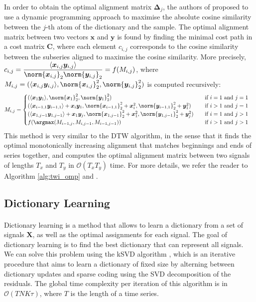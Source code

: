 \documentclass[11pt]{article}
\begin{document}
In order to obtain the optimal alignment matrix $\bm{\Delta}_j$, the authors of \cite{main_paper} proposed to use a dynamic programming approach to maximise the absolute cosine similarity between the $j$-th atom of the dictionary and the sample. The optimal alignment matrix between two vectors $\bm{x}$ and $\bm{y}$ is found by finding the minimal cost path in a cost matrix $\bm{C}$, where each element $c_{i, j}$ corresponds to the cosine similarity between the subseries aligned to maximise the cosine similarity. More precisely, $c_{i, j} = \dfrac{\langle \bm{x}_{i, j} \bm{y}_{i, j} \rangle}{\norm{\bm{x}_{i, j}}_2\norm{\bm{y}_{i, j}}_2} = f(M_{i, j})$, where $M_{i, j} = (\langle \bm{x}_{i, j} \bm{y}_{i, j} \rangle, \norm{\bm{x}_{i, j}}^2_2, \norm{\bm{y}_{i, j}}^2_2)$ is computed recursively:
\begin{alignat*}{3}
    M_{i, j} &= \begin{cases}
        (\langle \bm{x}_1 \bm{y}_1 \rangle, \norm{\bm{x}_1}^2_2, \norm{\bm{y}_1}^2_2) &\quad \text{if } i = 1 \text{ and } j = 1 \\
        (\langle \bm{x}_{i-1, 1} \bm{y}_{i-1, 1} \rangle + \bm{x}_i\bm{y}_1, \norm{\bm{x}_{i-1, 1}}^2_2 + \bm{x}_i^2, \norm{\bm{y}_{i-1, 1}}^2_2 + \bm{y}_1^2) &\quad \text{if } i > 1 \text{ and } j = 1 \\
        (\langle \bm{x}_{1, j-1} \bm{y}_{1, j-1} \rangle + \bm{x}_1\bm{y}_j, \norm{\bm{x}_{1, j-1}}^2_2 + \bm{x}_1^2, \norm{\bm{y}_{1, j-1}}^2_2 + \bm{y}_j^2) &\quad \text{if } i = 1 \text{ and } j > 1 \\
        f(\argmax (M_{i-1, j}, M_{i, j-1}, M_{i-1, j-1})) &\quad \text{if } i > 1 \text{ and } j > 1
    \end{cases}
\end{alignat*}
This method is very similar to the DTW algorithm, in the sense that it finds the optimal monotonically increasing alignment that matches beginnings and ends of series together, and computes the optimal alignment matrix between two signals of lengths $T_x$ and $T_y$ in $\mathcal{O}(T_x T_y)$ time. For more details, we refer the reader to Algorithm \ref{alg:twi_omp} and \cite{main_paper}. 

\subsection{Dictionary Learning}

\paragraph{} Dictionary learning is a method that allows to learn a dictionary from a set of signals $\bm{X}$, as well as the optimal assignments for each signal. The goal of dictionary learning is to find the best dictionary that can represent all signals. We can solve this problem using the kSVD algorithm \cite{ksvd}, which is an iterative procedure that aims to learn a dictionary of fixed size by alterning between dictionary updates and sparse coding using the SVD decomposition of the residuals. The global time complexity per iteration of this algorithm is in $\mathcal{O}(T N K \tau)$, where $T$ is the length of a time series.
\end{document}
